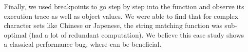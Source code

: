 Finally, we used breakpoints to go step by step into the function and observe its execution trace as well as object values.
We were able to find that for complex character sets like Chinese or Japenese, the string matching function was sub-optimal (had a lot of redundant computation).
We believe this case study shows a classical performance bug, where \parikshan can be beneficial.



